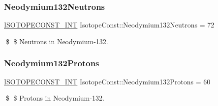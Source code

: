 \subsubsection{\texorpdfstring{Neodymium132\+Neutrons}{Neodymium132Neutrons}}
{\footnotesize\ttfamily \mbox{\hyperlink{group___isotope_const-_macros_ga5f18360b3e99483a35c32d789e62621c}{I\+S\+O\+T\+O\+P\+E\+C\+O\+N\+S\+T\+\_\+\+I\+NT}} Isotope\+Const\+::\+Neodymium132\+Neutrons = 72}

\$ \$ Neutrons in Neodymium-\/132. \mbox{\label{group___isotope_const-_neodymium-_nd132_ga29c8d828d88657f9331dd3d93006beef}} 
\subsubsection{\texorpdfstring{Neodymium132\+Protons}{Neodymium132Protons}}
{\footnotesize\ttfamily \mbox{\hyperlink{group___isotope_const-_macros_ga5f18360b3e99483a35c32d789e62621c}{I\+S\+O\+T\+O\+P\+E\+C\+O\+N\+S\+T\+\_\+\+I\+NT}} Isotope\+Const\+::\+Neodymium132\+Protons = 60}

\$ \$ Protons in Neodymium-\/132. 